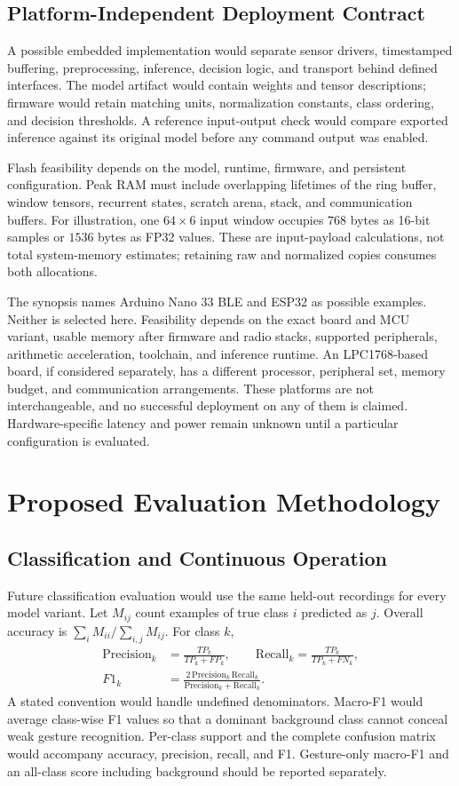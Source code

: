 \documentclass[conference]{IEEEtran}
\begin{document}
\subsection{Platform-Independent Deployment Contract}
A possible embedded implementation would separate sensor drivers, timestamped buffering, preprocessing, inference, decision logic, and transport behind defined interfaces. The model artifact would contain weights and tensor descriptions; firmware would retain matching units, normalization constants, class ordering, and decision thresholds. A reference input-output check would compare exported inference against its original model before any command output was enabled.

Flash feasibility depends on the model, runtime, firmware, and persistent configuration. Peak RAM must include overlapping lifetimes of the ring buffer, window tensors, recurrent states, scratch arena, stack, and communication buffers. For illustration, one $64\times6$ input window occupies $768$ bytes as 16-bit samples or $1536$ bytes as FP32 values. These are input-payload calculations, not total system-memory estimates; retaining raw and normalized copies consumes both allocations.

The synopsis names Arduino Nano 33 BLE and ESP32 as possible examples. Neither is selected here. Feasibility depends on the exact board and MCU variant, usable memory after firmware and radio stacks, supported peripherals, arithmetic acceleration, toolchain, and inference runtime. An LPC1768-based board, if considered separately, has a different processor, peripheral set, memory budget, and communication arrangements. These platforms are not interchangeable, and no successful deployment on any of them is claimed. Hardware-specific latency and power remain unknown until a particular configuration is evaluated.

\section{Proposed Evaluation Methodology}
\subsection{Classification and Continuous Operation}
Future classification evaluation would use the same held-out recordings for every model variant. Let $M_{ij}$ count examples of true class $i$ predicted as $j$. Overall accuracy is $\sum_i M_{ii}/\sum_{i,j}M_{ij}$. For class $k$,
\begin{align}
\mathrm{Precision}_k &= \frac{TP_k}{TP_k+FP_k},\qquad
\mathrm{Recall}_k = \frac{TP_k}{TP_k+FN_k},\\
F1_k &= \frac{2\,\mathrm{Precision}_k\,\mathrm{Recall}_k}
{\mathrm{Precision}_k+\mathrm{Recall}_k}.
\end{align}
A stated convention would handle undefined denominators. Macro-F1 would average class-wise F1 values so that a dominant background class cannot conceal weak gesture recognition. Per-class support and the complete confusion matrix would accompany accuracy, precision, recall, and F1. Gesture-only macro-F1 and an all-class score including background should be reported separately.
\end{document}
